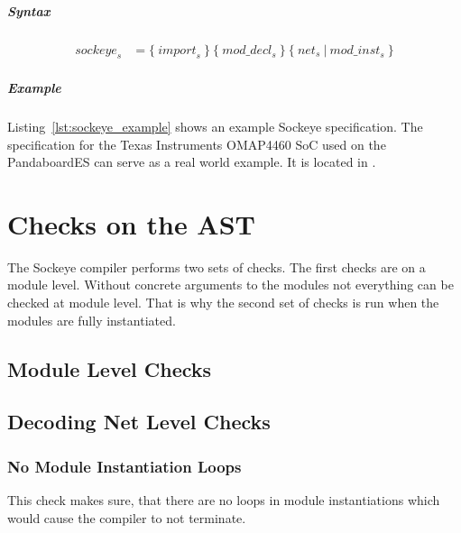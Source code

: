 \documentclass[a4paper,11pt,twoside]{report}
\begin{document}
{{{\paragraph{Syntax}
\begin{align*}
    \textit{sockeye}_s & \mathop{=}
        \big\{\ 
            \textit{import}_s\ 
        \big\}\ 
        \big\{\ 
            \textit{mod\_decl}_s\ 
        \big\}\ 
        \big\{\ 
            \textit{net}_s\ |\ \textit{mod\_inst}_s\ 
        \big\}
\end{align*}

\paragraph{Example}
Listing~\ref{lst:sockeye_example} shows an example Sockeye specification.
The specification for the Texas Instruments OMAP4460 SoC used on the PandaboardES can serve as a real world example. It is located in .

\clearpage



\chapter{Checks on the AST}
\label{chap:checks}
The Sockeye compiler performs two sets of checks.
The first checks are on a module level.
Without concrete arguments to the modules not everything can be checked at module level.
That is why the second set of checks is run when the modules are fully instantiated.

\section{Module Level Checks}


\section{Decoding Net Level Checks}
\subsection{No Module Instantiation Loops}
This check makes sure, that there are no loops in module instantiations which would cause the compiler to not terminate.

}}}
\end{document}

